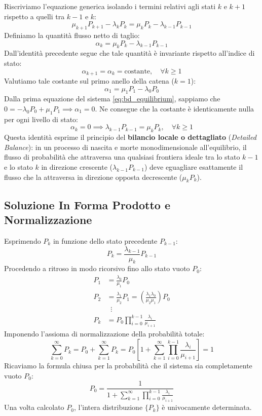 \documentclass[11pt, a4paper]{article}
\begin{document}
Riscriviamo l'equazione generica isolando i termini relativi agli stati $k$ e $k+1$ rispetto a quelli tra $k-1$ e $k$:
\[
    \mu_{k+1}P_{k+1} - \lambda_k P_k = \mu_k P_k - \lambda_{k-1}P_{k-1}
\]
Definiamo la quantità flusso netto di taglio:
\[
    \alpha_k = \mu_k P_k - \lambda_{k-1}P_{k-1}
\]
Dall'identità precedente segue che tale quantità è invariante rispetto all'indice di stato:
\[
    \alpha_{k+1} = \alpha_k = \text{costante}, \quad \forall k \ge 1
\]
Valutiamo tale costante sul primo anello della catena ($k = 1$):
\[
    \alpha_1 = \mu_1 P_1 - \lambda_0 P_0
\]
Dalla prima equazione del sistema \eqref{eq:bd_equilibrium}, sappiamo che $0 = -\lambda_0 P_0 + \mu_1 P_1 \implies \alpha_1 = 0$. Ne consegue che la costante è identicamente nulla per ogni livello di stato:
\[
    \alpha_k = 0 \implies \boxed{\lambda_{k-1}P_{k-1} = \mu_k P_k, \quad \forall k \ge 1}
\]
Questa identità esprime il principio del \textbf{bilancio locale o dettagliato} (\emph{Detailed Balance}): in un processo di nascita e morte monodimensionale all'equilibrio, il flusso di probabilità che attraversa una qualsiasi frontiera ideale tra lo stato $k-1$ e lo stato $k$ in direzione crescente ($\lambda_{k-1}P_{k-1}$) deve eguagliare esattamente il flusso che la attraversa in direzione opposta decrescente ($\mu_k P_k$).

\subsection{Soluzione In Forma Prodotto e Normalizzazione}

Esprimendo $P_k$ in funzione dello stato precedente $P_{k-1}$:
\[
    P_k = \frac{\lambda_{k-1}}{\mu_k} P_{k-1}
\]
Procedendo a ritroso in modo ricorsivo fino allo stato vuoto $P_0$:
\begin{align*}
    P_1 &= \frac{\lambda_0}{\mu_1} P_0 \\
    P_2 &= \frac{\lambda_1}{\mu_2} P_1 = \left( \frac{\lambda_1 \lambda_0}{\mu_2 \mu_1} \right) P_0 \\
    &\;\;\vdots \\
    P_k &= P_0 \prod_{i=0}^{k-1} \frac{\lambda_i}{\mu_{i+1}}
\end{align*}
Imponendo l'assioma di normalizzazione della probabilità totale:
\[
    \sum_{k=0}^{\infty} P_k = P_0 + \sum_{k=1}^{\infty} P_k = P_0 \left[ 1 + \sum_{k=1}^{\infty} \prod_{i=0}^{k-1} \frac{\lambda_i}{\mu_{i+1}} \right] = 1
\]
Ricaviamo la formula chiusa per la probabilità che il sistema sia completamente vuoto $P_0$:
\[
    \boxed{P_0 = \frac{1}{1 + \displaystyle\sum_{k=1}^{\infty} \prod_{i=0}^{k-1} \frac{\lambda_i}{\mu_{i+1}}}}
\]
Una volta calcolato $P_0$, l'intera distribuzione $\{P_k\}$ è univocamente determinata.
\end{document}

